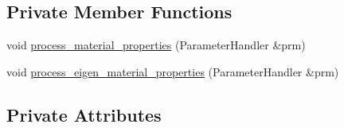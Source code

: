 \subsection*{Private Member Functions}
\begin{DoxyCompactItemize}
\item 
void \hyperlink{class_material_properties_a83121d60325c02dbce98968b45134993}{process\+\_\+material\+\_\+properties} (Parameter\+Handler \&prm)
\item 
void \hyperlink{class_material_properties_a2a25d8392fb1002f27e048d40f37d627}{process\+\_\+eigen\+\_\+material\+\_\+properties} (Parameter\+Handler \&prm)
\end{DoxyCompactItemize}
\subsection*{Private Attributes}
